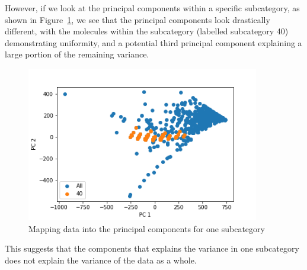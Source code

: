 \documentclass[12pt, oneside]{article}   	%
\begin{document}
However, if we look at the principal components within a specific subcategory, as shown in Figure~\ref{fig:pc2}, we see that the principal components look drastically different, with the molecules within the subcategory (labelled subcategory 40) demonstrating uniformity, and a potential third principal component explaining a large portion of the remaining variance.

\begin{figure}[!h] %
   \centering
   \includegraphics[width=4in]{PCA_subcat40.png} 
   \caption{Mapping data into the principal components for one subcategory}
   \label{fig:pc2}
\end{figure}

This suggests that the components that explains the variance in one subcategory does not explain the variance of the data as a whole. 

{}

\end{document}
